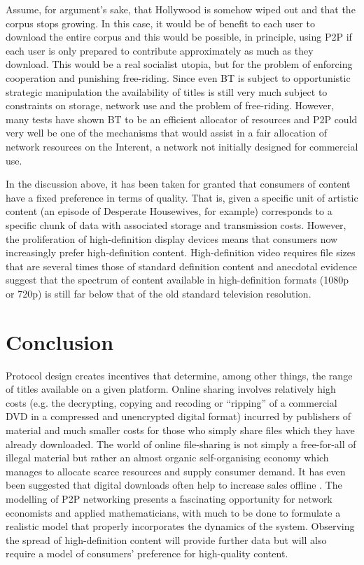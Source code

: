 \documentclass[12pt,english]{apa6}
\begin{document}
Assume, for argument's sake, that Hollywood is somehow wiped out and
that the corpus stops growing. In this case, it would be of benefit
to each user to download the entire corpus and this would be possible,
in principle, using P2P if each user is only prepared to contribute
approximately as much as they download. This would be a real socialist
utopia, but for the problem of enforcing cooperation and punishing
free-riding. Since even BT is subject to opportunistic strategic manipulation
\citep{levin_bittorrent_2008} the availability of titles is still
very much subject to constraints on storage, network use and the problem
of free-riding. However, many tests have shown BT to be an efficient
allocator of resources and P2P could very well be one of the mechanisms
that would assist in a fair allocation of network resources on the
Interent, a network not initially designed for commercial use.

In the discussion above, it has been taken for granted that consumers of content have a fixed preference in terms of quality. That is, given a specific unit of artistic content (an episode of Desperate Housewives, for example) corresponds to a specific chunk of data with associated storage and transmission costs. However, the proliferation of high-definition display devices means that consumers now increasingly prefer high-definition content. High-definition video requires file sizes that are several times those of standard definition content and anecdotal evidence suggest that the spectrum of content available in high-definition formats (1080p or 720p) is still far below that of the old standard television resolution. 


\section{Conclusion}

Protocol design creates incentives that determine,‭ among other things,‭ the range of titles available on a given platform.‭ Online sharing involves relatively high costs (e.g. the decrypting, copying and recoding or “ripping” of a commercial DVD in a compressed and unencrypted digital format) incurred by publishers of material and much smaller costs
for those who simply share files which they have already downloaded. The world of online file-sharing is not simply a free-for-all of illegal material but rather an almost organic self-organising economy which manages to allocate scarce resources and supply consumer demand. It has even been suggested that digital downloads often help to increase
sales offline \citep{peitz_music_2006}. The modelling of P2P networking presents a fascinating opportunity for network economists and applied mathematicians, with much to be done to formulate a realistic model that properly incorporates the dynamics of the system. Observing the spread of high-definition content will provide further data but will also require a model of consumers' preference for high-quality content.





\end{document}
